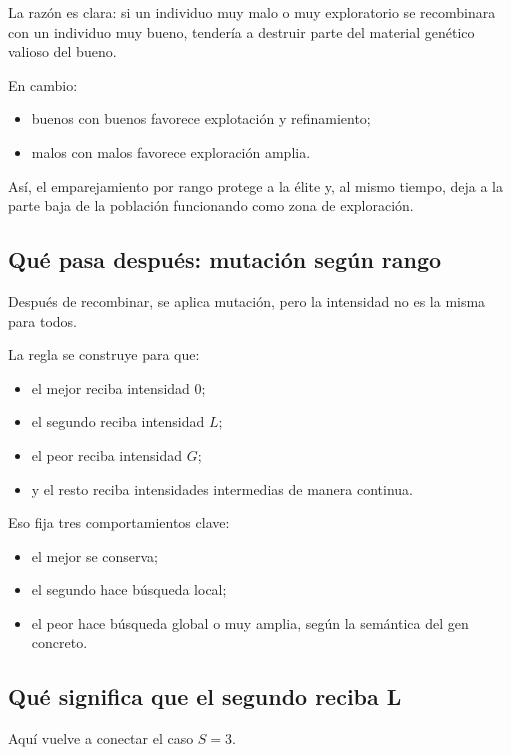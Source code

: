 \documentclass[11pt]{article}
\begin{document}
La raz\'on es clara: si un individuo muy malo o muy exploratorio se
recombinara con un individuo muy bueno, tender\'ia a destruir parte del
material gen\'etico valioso del bueno.

En cambio:

\begin{itemize}
  \item buenos con buenos favorece explotaci\'on y refinamiento;
  \item malos con malos favorece exploraci\'on amplia.
\end{itemize}

As\'i, el emparejamiento por rango protege a la \'elite y, al mismo tiempo,
deja a la parte baja de la poblaci\'on funcionando como zona de exploraci\'on.

\subsection{Qu\'e pasa despu\'es: mutaci\'on seg\'un rango}

Despu\'es de recombinar, se aplica mutaci\'on, pero la intensidad no es la
misma para todos.

La regla se construye para que:

\begin{itemize}
  \item el mejor reciba intensidad \(0\);
  \item el segundo reciba intensidad \(L\);
  \item el peor reciba intensidad \(G\);
  \item y el resto reciba intensidades intermedias de manera continua.
\end{itemize}

Eso fija tres comportamientos clave:

\begin{itemize}
  \item el mejor se conserva;
  \item el segundo hace b\'usqueda local;
  \item el peor hace b\'usqueda global o muy amplia, seg\'un la sem\'antica del
  gen concreto.
\end{itemize}

\subsection{Qu\'e significa que el segundo reciba L}

Aqu\'i vuelve a conectar el caso \(S=3\).
\end{document}
